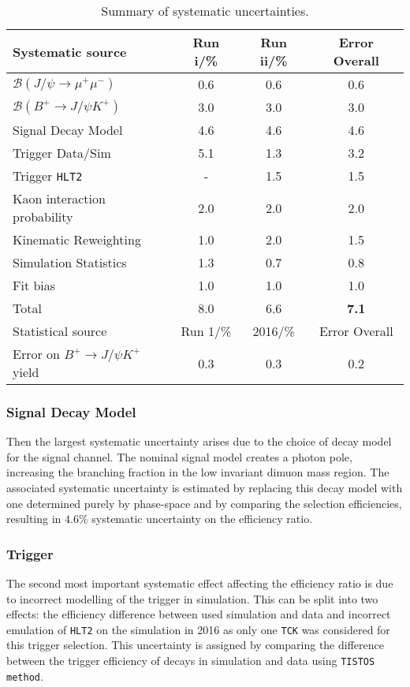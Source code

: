 \begin{table}[H]
\centering
\small
\begin{tabular}{ l | c  c | c  }
\hline
Systematic source & Run \Rn{1}/\% &  Run \Rn{2}/\% & Error Overall \\ \hline
\hline
$\mathcal{B}(J/\psi \rightarrow \mu^{+} \mu^{-})$ & 0.6 & 0.6 & 0.6\\
$\mathcal{B}(B^{+} \rightarrow  J/\psi K^{+})$ & 3.0 & 3.0 & 3.0\\
\hline
Signal Decay Model & 4.6 & 4.6 & 4.6\\
Trigger Data/Sim & 5.1 & 1.3& 3.2\\
Trigger \texttt{HLT2} &  -  &  1.5& 1.5\\
Kaon interaction probability &  2.0  &  2.0& 2.0\\
Kinematic Reweighting & 1.0 & 2.0 &1.5\\
Simulation Statistics & 1.3 & 0.7 & 0.8 \\
Fit bias & 1.0 & 1.0 & 1.0  \\
 \hline
 \hline
 Total & 8.0 & 6.6 & \textbf{7.1} \\
 \hline
Statistical source & Run 1/\% & 2016/\% & Error Overall \\ \hline
 \hline
Error on $B^{+} \rightarrow J/\psi K^{+}$ yield & 0.3 & 0.3 & 0.2\\
 \hline
\end{tabular}
\caption{Summary of systematic uncertainties.}
\label{tab:systematicsummary}
\end{table}




\subsubsection{Signal Decay Model}
Then the largest systematic uncertainty arises due to the choice of decay model for the signal channel.
The nominal signal model creates a photon pole, increasing the branching fraction in the low invariant dimuon mass region.
The associated systematic uncertainty is estimated by replacing this decay model with one determined purely by phase-space and by comparing the selection efficiencies, resulting in $4.6\%$ systematic uncertainty on the efficiency ratio. %

\subsubsection{Trigger}
The second most important systematic effect affecting the efficiency ratio is due to incorrect modelling of the trigger in simulation. This can be split into two effects:
 the efficiency difference between used simulation and data and incorrect emulation of \texttt{HLT2} on the simulation in 2016 as only one \texttt{TCK} was considered for this trigger selection. This uncertainty is assigned by comparing the difference between the trigger efficiency of \bjpsimumuk decays in simulation and data using \texttt{TISTOS method}.


